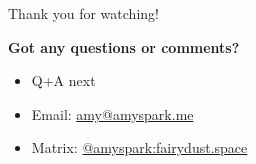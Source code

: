 \documentclass[final, aspectratio=169]{divoc}
\begin{document}
\begin{frame}{Thank you for watching!}
  \begin{center}
    {
      \large
      \textbf{Got any questions or comments?}
    }
    \begin{itemize}[<*>]
      \item Q+A next
      \item Email: \href{mailto:amy@amyspark.me?subject="DiVOC 2022"}{amy@amyspark.me}
      \item Matrix: \href{https://matrix.to/\#/@amyspark:fairydust.space}{@amyspark:fairydust.space}
    \end{itemize}
  \end{center}
\end{frame}
\end{document}

